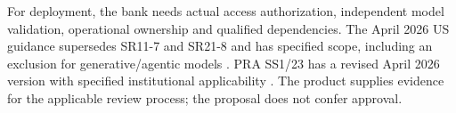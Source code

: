 \documentclass[11pt,a4paper,openany]{book}
\begin{document}
For deployment, the bank needs actual access authorization, independent
model validation, operational ownership and qualified dependencies. The
April 2026 US guidance supersedes SR11-7 and SR21-8 and has specified
scope, including an exclusion for generative/agentic models
\citep{fed2026}. PRA SS1/23 has a revised April 2026 version with specified
institutional applicability \citep{pra2026}. The product supplies evidence
for the applicable review process; the proposal does not confer approval.

\begingroup\small


\endgroup
\end{document}
